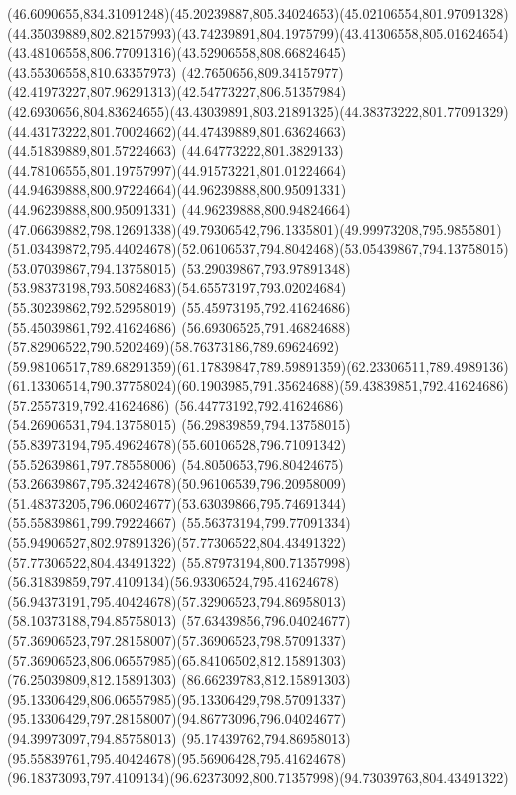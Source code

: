 {{		\curveto(46.6090655,834.31091248)(45.20239887,805.34024653)(45.02106554,801.97091328)
		\curveto(44.35039889,802.82157993)(43.74239891,804.1975799)(43.41306558,805.01624654)
		\curveto(43.48106558,806.77091316)(43.52906558,808.66824645)(43.55306558,810.63357973)
		\curveto(42.7650656,809.34157977)(42.41973227,807.96291313)(42.54773227,806.51357984)
		\curveto(42.6930656,804.83624655)(43.43039891,803.21891325)(44.38373222,801.77091329)
		\curveto(44.43173222,801.70024662)(44.47439889,801.63624663)(44.51839889,801.57224663)
		\curveto(44.64773222,801.3829133)(44.78106555,801.19757997)(44.91573221,801.01224664)
		\curveto(44.94639888,800.97224664)(44.96239888,800.95091331)(44.96239888,800.95091331)
		\lineto(44.96239888,800.94824664)
		\curveto(47.06639882,798.12691338)(49.79306542,796.1335801)(49.99973208,795.9855801)
		\curveto(51.03439872,795.44024678)(52.06106537,794.8042468)(53.05439867,794.13758015)
		\lineto(53.07039867,794.13758015)
		\lineto(53.29039867,793.97891348)
		\curveto(53.98373198,793.50824683)(54.65573197,793.02024684)(55.30239862,792.52958019)
		\lineto(55.45973195,792.41624686)
		\lineto(55.45039861,792.41624686)
		\curveto(56.69306525,791.46824688)(57.82906522,790.5202469)(58.76373186,789.69624692)
		\curveto(59.98106517,789.68291359)(61.17839847,789.59891359)(62.23306511,789.4989136)
		\curveto(61.13306514,790.37758024)(60.1903985,791.35624688)(59.43839851,792.41624686)
		\lineto(57.2557319,792.41624686)
		\lineto(56.44773192,792.41624686)
		\lineto(54.26906531,794.13758015)
		\lineto(56.29839859,794.13758015)
		\curveto(55.83973194,795.49624678)(55.60106528,796.71091342)(55.52639861,797.78558006)
		\curveto(54.8050653,796.80424675)(53.26639867,795.32424678)(50.96106539,796.20958009)
		\curveto(51.48373205,796.06024677)(53.63039866,795.74691344)(55.55839861,799.79224667)
		\lineto(55.56373194,799.77091334)
		\curveto(55.94906527,802.97891326)(57.77306522,804.43491322)(57.77306522,804.43491322)
		\curveto(55.87973194,800.71357998)(56.31839859,797.4109134)(56.93306524,795.41624678)
		\curveto(56.94373191,795.40424678)(57.32906523,794.86958013)(58.10373188,794.85758013)
		\curveto(57.63439856,796.04024677)(57.36906523,797.28158007)(57.36906523,798.57091337)
		\curveto(57.36906523,806.06557985)(65.84106502,812.15891303)(76.25039809,812.15891303)
		\curveto(86.66239783,812.15891303)(95.13306429,806.06557985)(95.13306429,798.57091337)
		\curveto(95.13306429,797.28158007)(94.86773096,796.04024677)(94.39973097,794.85758013)
		\curveto(95.17439762,794.86958013)(95.55839761,795.40424678)(95.56906428,795.41624678)
		\curveto(96.18373093,797.4109134)(96.62373092,800.71357998)(94.73039763,804.43491322)
}}
